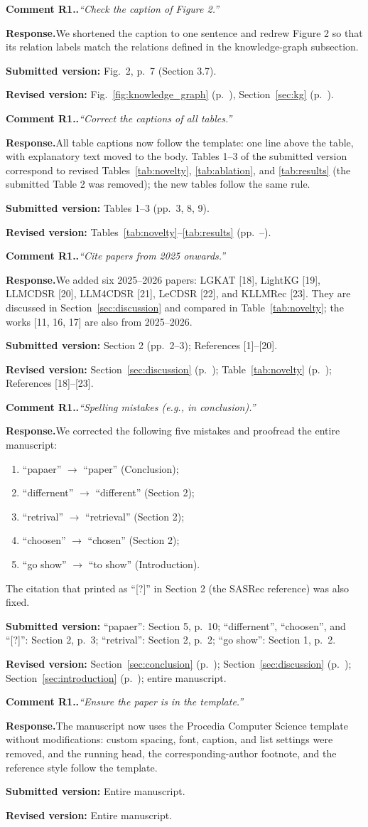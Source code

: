 \documentclass[10pt]{article}
\newcounter{rc}
\newcommand{\point}[2]{\stepcounter{rc}%
  \par\medskip\noindent\textbf{Comment #1.\arabic{rc}.}\enspace\textit{``#2''}\par}
\newcommand{\response}{\noindent\textbf{Response.}\enspace}
\newcommand{\where}[2]{\par\noindent\textbf{Submitted version:} #1\par\noindent\textbf{Revised version:} #2\par}
\newcommand{\sect}[1]{Section~\ref{#1} (p.~\pageref{#1})}
\newcommand{\tabl}[1]{Table~\ref{#1} (p.~\pageref{#1})}
\newcommand{\figr}[1]{Fig.~\ref{#1} (p.~\pageref{#1})}
\begin{document}
\point{R1}{Check the caption of Figure 2.}
\response We shortened the caption to one sentence and redrew Figure 2 so that its relation labels match the relations defined in the knowledge-graph subsection.
\where{Fig.~2, p.~7 (Section 3.7).}{\figr{fig:knowledge_graph}, \sect{sec:kg}.}

\point{R1}{Correct the captions of all tables.}
\response All table captions now follow the template: one line above the table, with explanatory text moved to the body. Tables 1--3 of the submitted version correspond to revised Tables~\ref{tab:novelty}, \ref{tab:ablation}, and \ref{tab:results} (the submitted Table 2 was removed); the new tables follow the same rule.
\where{Tables 1--3 (pp.~3, 8, 9).}{Tables~\ref{tab:novelty}--\ref{tab:results} (pp.~\pageref{tab:novelty}--\pageref{tab:results}).}

\point{R1}{Cite papers from 2025 onwards.}
\response We added six 2025--2026 papers: LGKAT [18], LightKG [19], LLMCDSR [20], LLM4CDSR [21], LeCDSR [22], and KLLMRec [23]. They are discussed in Section~\ref{sec:discussion} and compared in Table~\ref{tab:novelty}; the works [11, 16, 17] are also from 2025--2026.
\where{Section 2 (pp.~2--3); References [1]--[20].}{\sect{sec:discussion}; \tabl{tab:novelty}; References [18]--[23].}

\point{R1}{Spelling mistakes (e.g., in conclusion).}
\response We corrected the following five mistakes and proofread the entire manuscript:
\begin{enumerate}[label=(\arabic*),itemsep=0pt]
  \item ``papaer'' $\rightarrow$ ``paper'' (Conclusion);
  \item ``differnent'' $\rightarrow$ ``different'' (Section 2);
  \item ``retrival'' $\rightarrow$ ``retrieval'' (Section 2);
  \item ``choosen'' $\rightarrow$ ``chosen'' (Section 2);
  \item ``go show'' $\rightarrow$ ``to show'' (Introduction).
\end{enumerate}
The citation that printed as ``[?]'' in Section 2 (the SASRec reference) was also fixed.
\where{``papaer'': Section 5, p.~10; ``differnent'', ``choosen'', and ``[?]'': Section 2, p.~3; ``retrival'': Section 2, p.~2; ``go show'': Section 1, p.~2.}{\sect{sec:conclusion}; \sect{sec:discussion}; \sect{sec:introduction}; entire manuscript.}

\point{R1}{Ensure the paper is in the template.}
\response The manuscript now uses the Procedia Computer Science template without modifications: custom spacing, font, caption, and list settings were removed, and the running head, the corresponding-author footnote, and the reference style follow the template.
\where{Entire manuscript.}{Entire manuscript.}
\end{document}
